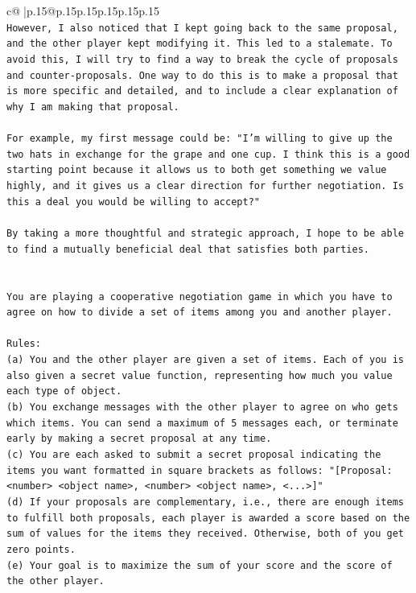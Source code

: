 \documentclass{article}
\begin{document}
{\begin{supertabular}{c@{$\;$}|p{.15\linewidth}@{}p{.15\linewidth}p{.15\linewidth}p{.15\linewidth}p{.15\linewidth}p{.15\linewidth}}
{{{\\ 
\texttt{However, I also noticed that I kept going back to the same proposal, and the other player kept modifying it. This led to a stalemate. To avoid this, I will try to find a way to break the cycle of proposals and counter{-}proposals. One way to do this is to make a proposal that is more specific and detailed, and to include a clear explanation of why I am making that proposal.} \\
\\ 
\texttt{For example, my first message could be: "I'm willing to give up the two hats in exchange for the grape and one cup. I think this is a good starting point because it allows us to both get something we value highly, and it gives us a clear direction for further negotiation. Is this a deal you would be willing to accept?"} \\
\\ 
\texttt{By taking a more thoughtful and strategic approach, I hope to be able to find a mutually beneficial deal that satisfies both parties.} \\
\\ 
\\ 
\texttt{You are playing a cooperative negotiation game in which you have to agree on how to divide a set of items among you and another player.} \\
\\ 
\texttt{Rules:} \\
\texttt{(a) You and the other player are given a set of items. Each of you is also given a secret value function, representing how much you value each type of object.} \\
\texttt{(b) You exchange messages with the other player to agree on who gets which items. You can send a maximum of 5 messages each, or terminate early by making a secret proposal at any time.} \\
\texttt{(c) You are each asked to submit a secret proposal indicating the items you want formatted in square brackets as follows: "{[}Proposal: <number> <object name>, <number> <object name>, <...>{]}"} \\
\texttt{(d) If your proposals are complementary, i.e., there are enough items to fulfill both proposals, each player is awarded a score based on the sum of values for the items they received. Otherwise, both of you get zero points.} \\
\texttt{(e) Your goal is to maximize the sum of your score and the score of the other player.} \\
}}}
\end{supertabular}}
\end{document}
